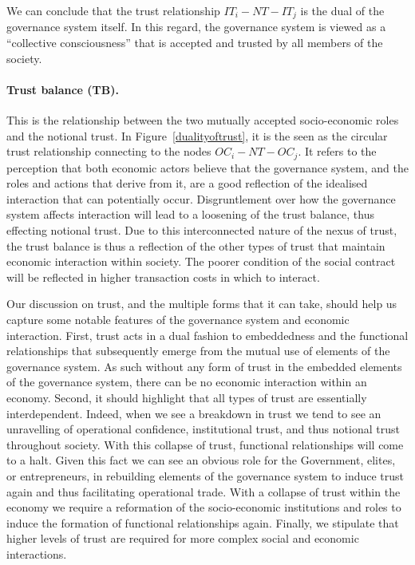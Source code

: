 \begin{subappendices}
We can conclude that the trust relationship $IT_{i}-NT-IT_{j}$ is the dual of the governance system itself. In this regard, the governance system is viewed as a ``collective consciousness'' that is accepted and trusted by all members of the society.

\paragraph{Trust balance (TB).}

This is the relationship between the two mutually accepted socio-economic roles and the notional trust. In Figure~\ref{dualityoftrust}, it is the seen as the circular trust relationship connecting to the nodes $OC_{i}-NT-OC_{j}$. It refers to the perception that both economic actors believe that the governance system, and the roles and actions that derive from it, are a good reflection of the idealised interaction that can potentially occur. Disgruntlement over how the governance system affects interaction will lead to a loosening of the trust balance, thus effecting notional trust. Due to this interconnected nature of the nexus of trust, the trust balance is thus a reflection of the other types of trust that maintain economic interaction within society. The poorer condition of the social contract will be reflected in higher transaction costs in which to interact.

Our discussion on trust, and the multiple forms that it can take, should help us capture some notable features of the governance system and economic interaction. First, trust acts in a dual fashion to embeddedness and the functional relationships that subsequently emerge from the mutual use of elements of the governance system. As such without any form of trust in the embedded elements of the governance system, there can be no economic interaction within an economy. Second, it should highlight that all types of trust are essentially interdependent. Indeed, when we see a breakdown in trust we tend to see an unravelling of operational confidence, institutional trust, and thus notional trust throughout society. With this collapse of trust, functional relationships will come to a halt. Given this fact we can see an obvious role for the Government, elites, or entrepreneurs, in rebuilding elements of the governance system to induce trust again and thus facilitating operational trade. With a collapse of trust within the economy we require a reformation of the socio-economic institutions and roles to induce the formation of functional relationships again. Finally, we stipulate that higher levels of trust are required for more complex social and economic interactions. 

\end{subappendices}








